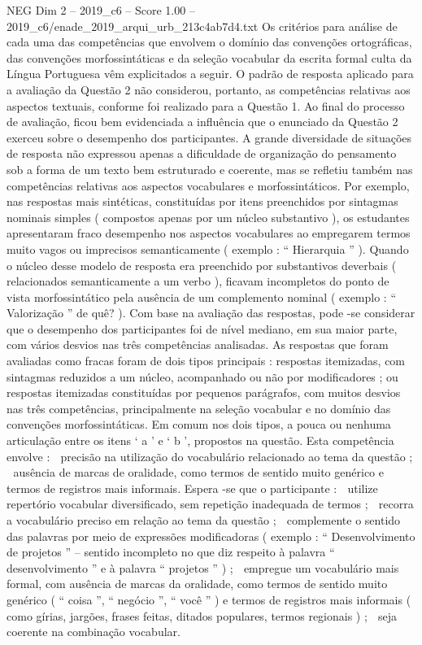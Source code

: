 \begin{textsample}{NEG Dim 2 – 2019\_c6 – Score 1.00 – 2019\_c6/enade\_2019\_arqui\_urb\_213c4ab7d4.txt}
Os critérios para análise de cada uma das competências que envolvem o domínio das convenções ortográficas, das convenções morfossintáticas e da seleção vocabular da escrita formal culta da Língua Portuguesa vêm explicitados a seguir.
O padrão de resposta aplicado para a avaliação da Questão 2 não considerou, portanto, as competências relativas aos aspectos textuais, conforme foi realizado para a Questão 1.
Ao final do processo de avaliação, ficou bem evidenciada a influência que o enunciado da Questão 2 exerceu sobre o desempenho dos participantes.
A grande diversidade de situações de resposta não expressou apenas a dificuldade de organização do pensamento sob a forma de um texto bem estruturado e coerente, mas se refletiu também nas competências relativas aos aspectos vocabulares e morfossintáticos.
Por exemplo, nas respostas mais sintéticas, constituídas por itens preenchidos por sintagmas nominais simples ( compostos apenas por um núcleo substantivo ), os estudantes apresentaram fraco desempenho nos aspectos vocabulares ao empregarem termos muito vagos ou imprecisos semanticamente ( exemplo : “ Hierarquia ” ).
Quando o núcleo desse modelo de resposta era preenchido por substantivos deverbais ( relacionados semanticamente a um verbo ), ficavam incompletos do ponto de vista morfossintático pela ausência de um complemento nominal ( exemplo : “ Valorização ” de quê? ).
Com base na avaliação das respostas, pode -se considerar que o desempenho dos participantes foi de nível mediano, em sua maior parte, com vários desvios nas três competências analisadas.
As respostas que foram avaliadas como fracas foram de dois tipos principais : respostas itemizadas, com sintagmas reduzidos a um núcleo, acompanhado ou não por modificadores ; ou respostas itemizadas constituídas por pequenos parágrafos, com muitos desvios nas três competências, principalmente na seleção vocabular e no domínio das convenções morfossintáticas.
Em comum nos dois tipos, a pouca ou nenhuma articulação entre os itens ‘ a ’ e ‘ b ’, propostos na questão.
Esta competência envolve :  precisão na utilização do vocabulário relacionado ao tema da questão ;  ausência de marcas de oralidade, como termos de sentido muito genérico e termos de registros mais informais.
Espera -se que o participante :  utilize repertório vocabular diversificado, sem repetição inadequada de termos ;  recorra a vocabulário preciso em relação ao tema da questão ;  complemente o sentido das palavras por meio de expressões modificadoras ( exemplo : “ Desenvolvimento de projetos ” – sentido incompleto no que diz respeito à palavra “ desenvolvimento ” e à palavra “ projetos ” ) ;  empregue um vocabulário mais formal, com ausência de marcas da oralidade, como termos de sentido muito genérico ( “ coisa ”, “ negócio ”, “ você ” ) e termos de registros mais informais ( como gírias, jargões, frases feitas, ditados populares, termos regionais ) ;  seja coerente na combinação vocabular.

\end{textsample}
